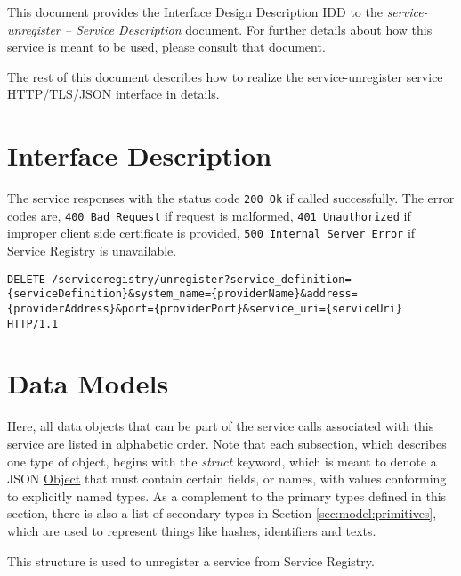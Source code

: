 \documentclass[a4paper]{arrowhead}
\newcommand{\fref}[1]{{\textcolor{ArrowheadBlue}{\hyperref[sec:functions:#1]{#1}}}}
\newcommand{\pref}[1]{{\textcolor{ArrowheadGrey}{\hyperref[sec:model:primitives:#1]{#1}}}}
\begin{document}
This document provides the Interface Design Description IDD to the \textit{service-unregister -- Service Description} document.
For further details about how this service is meant to be used, please consult that document.

The rest of this document describes how to realize the service-unregister service HTTP/TLS/JSON interface in details.

\newpage

\section{Interface Description}
\label{sec:functions}

The service responses with the status code \texttt{200
  Ok} if called successfully. The error codes are, \texttt{400
  Bad Request} if request is malformed, \texttt{401 Unauthorized} if
improper client side certificate is provided, \texttt{500 Internal
  Server Error} if Service Registry is unavailable.

\begin{lstlisting}[language=http,label={lst:unregister},caption={A \fref{service-unregister} invocation.}]
DELETE /serviceregistry/unregister?service_definition={serviceDefinition}&system_name={providerName}&address={providerAddress}&port={providerPort}&service_uri={serviceUri} HTTP/1.1
\end{lstlisting}

\newpage

\section{Data Models}
\label{sec:model}

Here, all data objects that can be part of the service calls associated with this service are listed in alphabetic order.
Note that each subsection, which describes one type of object, begins with the \textit{struct} keyword, which is meant to denote a JSON \pref{Object} that must contain certain fields, or names, with values conforming to explicitly named types.
As a complement to the primary types defined in this section, there is also a list of secondary types in Section \ref{sec:model:primitives}, which are used to represent things like hashes, identifiers and texts.


This structure is used to unregister a service from Service Registry.
\end{document}
